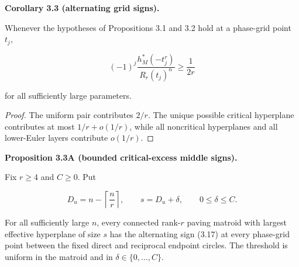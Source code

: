 \documentclass[10pt]{article}
\newenvironment{mdstatement}[1]
  {\par\Needspace{0.16\textheight}\noindent\textbf{#1.}\ \itshape}
  {\par\normalfont}
\begin{document}
\begin{mdstatement}{Corollary 3.3 (alternating grid signs)}


Whenever the hypotheses of Propositions 3.1 and 3.2 hold at a phase-grid
point $t_j$,

\[
 (-1)^j\frac{h_M^*(-t_j^r)}{R_r(t_j)^n}\ge\frac1{2r} \tag{3.17}
\]

for all sufficiently large parameters.

\end{mdstatement}

\begin{proof}


The uniform pair contributes $2/r$.  The unique possible critical
hyperplane contributes at most $1/r+o(1/r)$, while all noncritical
hyperplanes and all lower-Euler layers contribute $o(1/r)$.
\end{proof}


\begin{mdstatement}{Proposition 3.3A (bounded critical-excess middle signs)}


Fix $r\ge4$ and $C\ge0$.  Put

\[
 D_u=n-\left\lceil\frac nr\right\rceil,
 \qquad s=D_u+\delta,
 \qquad 0\le\delta\le C. \tag{3.17a}
\]

For all sufficiently large $n$, every connected rank-$r$ paving matroid
with largest effective hyperplane of size $s$ has the alternating sign
(3.17) at every phase-grid point between the fixed direct and reciprocal
endpoint circles.  The threshold is uniform in the matroid and in
$\delta\in\{0,\ldots,C\}$.

\end{mdstatement}
\end{document}
